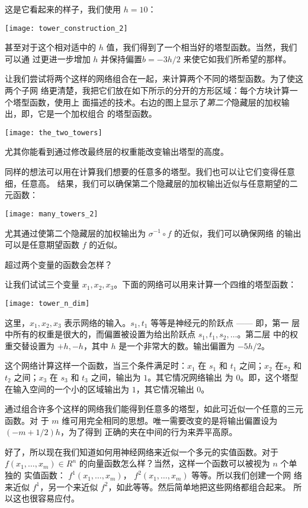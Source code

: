 这是它看起来的样子，我们使用 $h = 10$：
\begin{center}
  \texttt{[image: tower\_construction\_2]}
\end{center}

甚至对于这个相对适中的 $h$ 值，我们得到了一个相当好的塔型函数。当然，我们可以通
过更进一步增加 $h$ 并保持偏置$b = -3h/2$ 来使它如我们所希望的那样。

让我们尝试将两个这样的网络组合在一起，来计算两个不同的塔型函数。为了使这两个子网
络更清楚，我把它们放在如下所示的分开的方形区域：每个方块计算一个塔型函数，使用上
面描述的技术。右边的图上显示了\emph{第二个}隐藏层的加权输出，即，它是一个加权组合
的塔型函数。
\begin{center}
  \texttt{[image: the\_two\_towers]}
\end{center}

尤其你能看到通过修改最终层的权重能改变输出塔型的高度。

同样的想法可以用在计算我们想要的任意多的塔型。我们也可以让它们变得任意细，任意高。
结果，我们可以确保第二个隐藏层的加权输出近似与任意期望的二元函数：
\begin{center}
  \texttt{[image: many\_towers\_2]}
\end{center}

尤其通过使第二个隐藏层的加权输出为 $\sigma^{-1} \circ f$ 的近似，我们可以确保网络
的输出可以是任意期望函数 $f$ 的近似。

超过两个变量的函数会怎样？

让我们试试三个变量 $x_1, x_2, x_3$。下面的网络可以用来计算一个四维的塔型函数：
\begin{center}
  \texttt{[image: tower\_n\_dim]}
\end{center}

这里，$x_1, x_2, x_3$ 表示网络的输入。$s_1, t_1$ 等等是神经元的阶跃点 —— 即，第一
层中所有的权重是很大的，而偏置被设置为给出阶跃点 $s_1, t_1, s_2, \ldots$。第二层
中的权重交替设置为 $+h, -h$，其中 $h$ 是一个非常大的数。输出偏置为 $-5h/2$。

这个网络计算这样一个函数，当三个条件满足时：$x_1$ 在 $s_1$ 和 $t_1$ 之间；$x_2$
在$s_2$ 和 $t_2$ 之间；$x_3$ 在 $s_3$ 和 $t_3$ 之间，输出为 $1$。其它情况网络输出
为 $0$。即，这个塔型在输入空间的一个小的区域输出为 $1$，其它情况输出 $0$。

通过组合许多个这样的网络我们能得到任意多的塔型，如此可近似一个任意的三元函数。对
于 $m$ 维可用完全相同的思想。唯一需要改变的是将输出偏置设为 $(-m+1/2)h$，为了得到
正确的夹在中间的行为来弄平高原。%

好了，所以现在我们知道如何用神经网络来近似一个多元的实值函数。对于 $f(x_1,
\ldots, x_m) \in R^n$ 的向量函数怎么样？当然，这样一个函数可以被视为 $n$ 个单独的
实值函数： $f^1(x_1, \ldots, x_m)$， $f^2(x_1, \ldots, x_m)$ 等等。所以我们创建一个网
络来近似 $f^1$，另一个来近似 $f^2$，如此等等。然后简单地把这些网络都组合起来。 所
以这也很容易应付。


